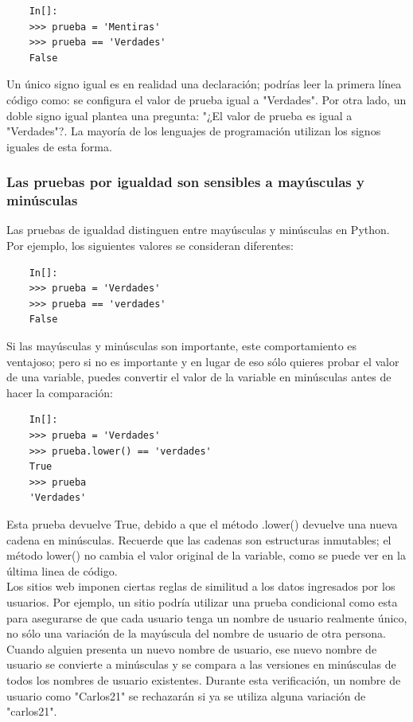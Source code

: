 \begin{lstlisting}
	In[]:	
	>>> prueba = 'Mentiras'
	>>> prueba == 'Verdades'	
	False
\end{lstlisting}

Un único signo igual es en realidad una declaración; podrías leer la primera línea código como: se configura el valor de prueba igual a  "Verdades". Por otra lado, un doble signo igual plantea una pregunta: "¿El valor de {\ttfamily prueba}  es igual a {}"{}Verdades{}"{}?. 
La mayoría de los lenguajes de programación utilizan los signos iguales de esta forma.

\subsubsection{Las pruebas por igualdad son sensibles a mayúsculas y minúsculas}

Las pruebas de igualdad distinguen entre mayúsculas y minúsculas en Python. Por ejemplo,
los siguientes valores se consideran diferentes: 

\begin{lstlisting}
	In[]:
	>>> prueba = 'Verdades'
	>>> prueba == 'verdades'
	False
\end{lstlisting}

Si las mayúsculas y minúsculas son importante, este comportamiento es ventajoso; pero si no es importante
y en lugar de eso sólo quieres probar el valor de una variable, puedes convertir el valor de la variable en minúsculas antes de hacer la comparación:

\begin{lstlisting}
	In[]:
	>>> prueba = 'Verdades'
	>>> prueba.lower() == 'verdades'
	True
	>>> prueba
	'Verdades'
\end{lstlisting}

Esta prueba devuelve {\ttfamily True}, debido a que el método {\ttfamily .lower()}  devuelve una nueva cadena en minúsculas. Recuerde que las cadenas son  estructuras inmutables; el método {\ttfamily lower()} no cambia el valor original de la variable,  como se puede ver en la última linea de código.\\


Los sitios web imponen ciertas reglas de similitud  a los datos ingresados por los usuarios. Por ejemplo, un sitio podría utilizar una prueba condicional como esta para asegurarse de que cada usuario tenga un nombre de usuario realmente único, no sólo una variación de la mayúscula del nombre de usuario de otra persona. Cuando alguien presenta un nuevo nombre de usuario, ese nuevo nombre de usuario se convierte a minúsculas y se compara a las versiones en minúsculas de todos los nombres de usuario existentes. Durante esta verificación, un nombre de usuario como {}"{}Carlos21{}"{} se rechazarán si ya se utiliza alguna variación de {}"{}carlos21{}"{}.



